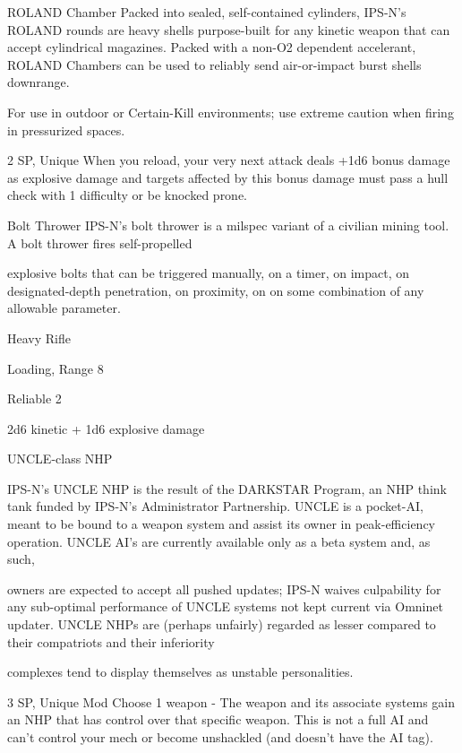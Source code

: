 ROLAND Chamber  
Packed into sealed, self-contained cylinders, IPS-N’s ROLAND rounds are heavy shells purpose-built for  
any kinetic weapon that can accept cylindrical magazines. Packed with a non-O2 dependent accelerant,  
ROLAND Chambers can be used to reliably send air-or-impact burst shells downrange.   

For use in outdoor or Certain-Kill environments; use extreme caution when firing in pressurized spaces.  

2 SP, Unique  
When you reload, your very next attack deals +1d6 bonus damage as explosive damage and  
targets affected by this bonus damage must pass a hull check with 1 difficulty or be knocked  
prone.
 

Bolt Thrower  
IPS-N’s bolt thrower is a milspec variant of a civilian mining tool. A bolt thrower fires self-propelled  

explosive bolts that can be triggered manually, on a timer, on impact, on designated-depth penetration, on  
proximity, on on some combination of any allowable parameter.   

Heavy Rifle
 
Loading, Range 8
 
Reliable 2
 
2d6 kinetic + 1d6 explosive damage
 

UNCLE-class NHP  

                                                                                                                  


IPS-N’s UNCLE NHP is the result of the DARKSTAR Program, an NHP think tank funded by IPS-N’s  
Administrator Partnership. UNCLE is a pocket-AI, meant to be bound to a weapon system and assist its  
owner in peak-efficiency operation. UNCLE AI’s are currently available only as a beta system and, as such,  

owners are expected to accept all pushed updates; IPS-N waives culpability for any sub-optimal  
performance of UNCLE systems not kept current via Omninet updater.   
UNCLE NHPs are (perhaps unfairly) regarded as lesser compared to their compatriots and their inferiority  

complexes tend to display themselves as unstable personalities.  

3 SP, Unique  
Mod  
Choose 1 weapon - The weapon and its associate systems gain an NHP that has control over  
that specific weapon. This is not a full AI and can’t control your mech or become unshackled  
(and doesn’t have the AI tag).
 

